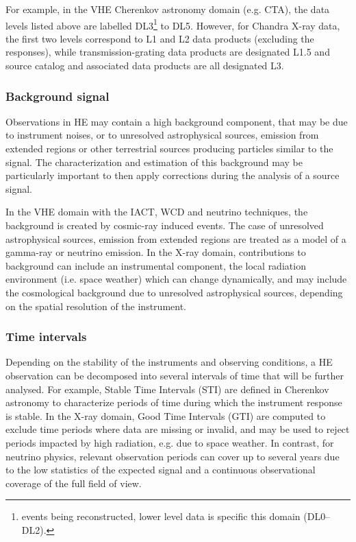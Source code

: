 \documentclass[11pt,a4paper]{ivoa}
\begin{document}
For example, in the VHE Cherenkov astronomy domain (e.g. CTA), the data levels listed above are labelled DL3\footnote{events being reconstructed, lower level data is specific this domain (DL0--DL2).} to DL5.  However, for Chandra X-ray data, the first two levels correspond  to L1 and L2 data products (excluding the responses), while transmission-grating data products are designated L1.5 and source catalog and associated data products are all designated L3.


\subsubsection{Background signal}

Observations in HE may contain a high background component, that may be due to instrument noises, or to unresolved astrophysical sources, emission from extended regions or other terrestrial sources producing particles similar to the signal. The characterization and estimation of this background may be particularly important to then apply corrections during the analysis of a source signal.

In the VHE domain with the IACT, WCD and neutrino techniques, the background is created by cosmic-ray induced events. The case of unresolved astrophysical sources, emission from extended regions are treated as a model of a gamma-ray or neutrino emission.  In the X-ray domain, contributions to background can include an instrumental component, the local radiation environment (i.e. space weather) which can change dynamically, and may include the cosmological background due to unresolved astrophysical sources, depending on the spatial resolution of the instrument.


\subsubsection{Time intervals}

Depending on the stability of the instruments and observing conditions, a HE observation can be decomposed into several intervals of time that will be further analysed.
For example, Stable Time Intervals (STI) are defined in Cherenkov astronomy to characterize periods of time during which the instrument response is stable. In the X-ray domain, Good Time Intervals (GTI) are computed to exclude time periods where data are missing or invalid, and may be used to reject periods impacted by high radiation, e.g. due to space weather. In contrast, for neutrino physics, relevant observation periods can cover up to several years due to the low statistics of the expected signal and a continuous observational coverage of the full field of view.
\end{document}
